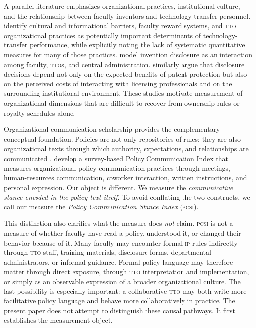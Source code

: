 \documentclass[12pt]{article}
\newcommand{\PCSI}{\textsc{pcsi}}
\newcommand{\IP}{\textsc{ip}}
\newcommand{\TTO}{\textsc{tto}}
\begin{document}
A parallel literature emphasizes organizational practices, institutional culture, and the relationship between faculty inventors and technology-transfer personnel. \citet{Siegel2003} identify cultural and informational barriers, faculty reward systems, and \TTO{} organizational practices as potentially important determinants of technology-transfer performance, while explicitly noting the lack of systematic quantitative measures for many of those practices. \citet{Jensen2003} model invention disclosure as an interaction among faculty, \TTO{}s, and central administration. \citet{OwenSmithPowell2001} similarly argue that disclosure decisions depend not only on the expected benefits of patent protection but also on the perceived costs of interacting with licensing professionals and on the surrounding institutional environment. These studies motivate measurement of organizational dimensions that are difficult to recover from ownership rules or royalty schedules alone.

Organizational-communication scholarship provides the complementary conceptual foundation. Policies are not only repositories of rules; they are also organizational texts through which authority, expectations, and relationships are communicated \citep{Phillips2004,Putnam2009}. \citet{Canary2013} develop a survey-based Policy Communication Index that measures organizational policy-communication practices through meetings, human-resources communication, coworker interaction, written instructions, and personal expression. Our object is different. We measure the \emph{communicative stance encoded in the policy text itself}. To avoid conflating the two constructs, we call our measure the \emph{Policy Communication Stance Index} (\PCSI).

This distinction also clarifies what the measure does \emph{not} claim. \PCSI{} is not a measure of whether faculty have read a policy, understood it, or changed their behavior because of it. Many faculty may encounter formal \IP{} rules indirectly through \TTO{} staff, training materials, disclosure forms, departmental administrators, or informal guidance. Formal policy language may therefore matter through direct exposure, through \TTO{} interpretation and implementation, or simply as an observable expression of a broader organizational culture. The last possibility is especially important: a collaborative \TTO{} may both write more facilitative policy language and behave more collaboratively in practice. The present paper does not attempt to distinguish these causal pathways. It first establishes the measurement object.
\end{document}
